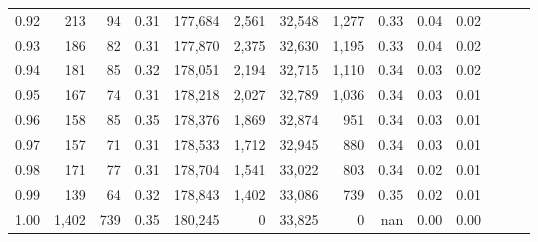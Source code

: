 \begin{tabular}{rrrrrrrrrrrrrr}
0.92 &    213 &   94 &  0.31 &  177,684 &    2,561 &  32,548 &   1,277 &  0.33 &  0.04 &      0.02 \\
0.93 &    186 &   82 &  0.31 &  177,870 &    2,375 &  32,630 &   1,195 &  0.33 &  0.04 &      0.02 \\
0.94 &    181 &   85 &  0.32 &  178,051 &    2,194 &  32,715 &   1,110 &  0.34 &  0.03 &      0.02 \\
0.95 &    167 &   74 &  0.31 &  178,218 &    2,027 &  32,789 &   1,036 &  0.34 &  0.03 &      0.01 \\
0.96 &    158 &   85 &  0.35 &  178,376 &    1,869 &  32,874 &     951 &  0.34 &  0.03 &      0.01 \\
0.97 &    157 &   71 &  0.31 &  178,533 &    1,712 &  32,945 &     880 &  0.34 &  0.03 &      0.01 \\
0.98 &    171 &   77 &  0.31 &  178,704 &    1,541 &  33,022 &     803 &  0.34 &  0.02 &      0.01 \\
0.99 &    139 &   64 &  0.32 &  178,843 &    1,402 &  33,086 &     739 &  0.35 &  0.02 &      0.01 \\
1.00 &  1,402 &  739 &  0.35 &  180,245 &        0 &  33,825 &       0 &   nan &  0.00 &      0.00 \\
\bottomrule
\end{tabular}

